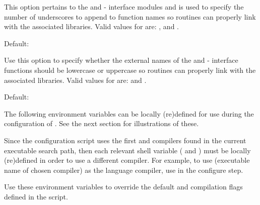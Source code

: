 \begin{config}

\item {}

  This option pertains to the {\fkinsol} and {\fcvode} {\F}-{\C} interface
  modules and is used to specify the number of underscores to append to
  function names so {\F} routines can properly link with the associated
  {\sundials} libraries. Valid values for  are: , 
  and .

  Default: 

\item {}

  Use this option to specify whether the external names of the {\fkinsol} and
  {\fcvode} {\F}-{\C} interface functions should be lowercase or uppercase so
  {\F} routines can properly link with the associated {\sundials} libraries. 
  Valid values for  are:  and .

  Default: 

\end{config}


\vspace{0.25in}
\noindent The following environment variables can be locally (re)defined for use during the configuration of {\sundials}. See the next section for illustrations of these.

\begin{config}

\item {}

\item {}

  Since the configuration script uses the first {\C} and {\F} compilers found in
  the current executable search path, then each relevant shell variable (
  and ) must be locally (re)defined in order to use a different compiler. 
  For example, to use  (executable name of chosen compiler) as the {\C}
  language compiler, use  in the configure step.

\item {}

\item {}

  Use these environment variables to override the default {\C} and {\F}
  compilation flags defined in the  script.

\end{config}

